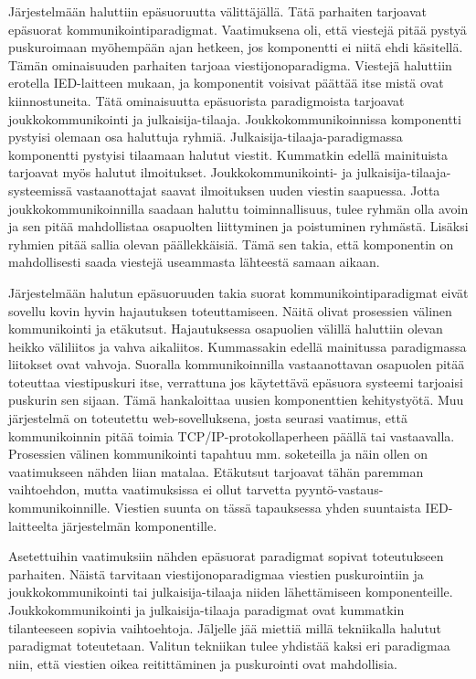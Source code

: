 Järjestelmään haluttiin epäsuoruutta välittäjällä. Tätä parhaiten tarjoavat epäsuorat kommunikointiparadigmat. Vaatimuksena oli, että viestejä pitää pystyä puskuroimaan myöhempään ajan hetkeen, jos komponentti ei niitä ehdi käsitellä. Tämän ominaisuuden parhaiten tarjoaa viestijonoparadigma. Viestejä haluttiin erotella IED-laitteen mukaan, ja komponentit voisivat päättää itse mistä ovat kiinnostuneita. Tätä ominaisuutta epäsuorista paradigmoista tarjoavat joukkokommunikointi ja julkaisija-tilaaja. Joukkokommunikoinnissa komponentti pystyisi olemaan osa haluttuja ryhmiä. Julkaisija-tilaaja-paradigmassa komponentti pystyisi tilaamaan halutut viestit. Kummatkin edellä mainituista tarjoavat myös halutut ilmoitukset. Joukkokommunikointi- ja julkaisija-tilaaja-systeemissä vastaanottajat saavat ilmoituksen uuden viestin saapuessa. Jotta joukkokommunikoinnilla saadaan haluttu toiminnallisuus, tulee ryhmän olla avoin ja sen pitää mahdollistaa osapuolten liittyminen ja poistuminen ryhmästä. Lisäksi ryhmien pitää sallia olevan päällekkäisiä. Tämä sen takia, että komponentin on mahdollisesti saada viestejä useammasta lähteestä samaan aikaan.

Järjestelmään halutun epäsuoruuden takia suorat kommunikointiparadigmat eivät sovellu kovin hyvin hajautuksen toteuttamiseen. Näitä olivat prosessien välinen kommunikointi ja etäkutsut. Hajautuksessa osapuolien välillä haluttiin olevan heikko väliliitos ja vahva aikaliitos. Kummassakin edellä mainitussa paradigmassa liitokset ovat vahvoja. Suoralla kommunikoinnilla vastaanottavan osapuolen pitää toteuttaa viestipuskuri itse, verrattuna jos käytettävä epäsuora systeemi tarjoaisi puskurin sen sijaan. Tämä hankaloittaa uusien komponenttien kehitystyötä. Muu järjestelmä on toteutettu web-sovelluksena, josta seurasi vaatimus, että kommunikoinnin pitää toimia TCP/IP-protokollaperheen päällä tai vastaavalla. Prosessien välinen kommunikointi tapahtuu mm. soketeilla ja näin ollen on vaatimukseen nähden liian matalaa. Etäkutsut tarjoavat tähän paremman vaihtoehdon, mutta vaatimuksissa ei ollut tarvetta pyyntö-vastaus-kommunikoinnille. Viestien suunta on tässä tapauksessa yhden suuntaista IED-laitteelta järjestelmän komponentille.

Asetettuihin vaatimuksiin nähden epäsuorat paradigmat sopivat toteutukseen parhaiten. Näistä tarvitaan viestijonoparadigmaa viestien puskurointiin ja joukkokommunikointi tai julkaisija-tilaaja niiden lähettämiseen komponenteille. Joukkokommunikointi ja julkaisija-tilaaja paradigmat ovat kummatkin tilanteeseen sopivia vaihtoehtoja. Jäljelle jää miettiä millä tekniikalla halutut paradigmat toteutetaan. Valitun tekniikan tulee yhdistää kaksi eri paradigmaa niin, että viestien oikea reitittäminen ja puskurointi ovat mahdollisia.

